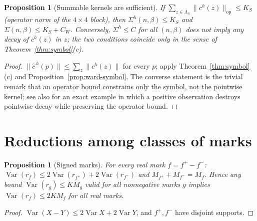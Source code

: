 \documentclass[11pt]{article}
\newtheorem{proposition}[theorem]{Proposition}
\theoremstyle{definition}
\newcommand{\Var}{\operatorname{Var}}
\begin{document}
\begin{proposition}[Summable kernels are sufficient]\label{prop:schur}
If $\sum_{z\in\Lambda_n}\|c^h(z)\|_{\mathrm{op}}\le K_S$ (operator norm of the $4\times4$ block), then
$\Sigma^h(n,\beta)\le K_S$ and $\Sigma(n,\beta)\le K_S+C_W$. Conversely, $\Sigma^h\le C$ for all $(n,\beta)$ does not
imply any decay of $c^h(z)$ in $z$; the two conditions coincide only in the sense of
Theorem~\ref{thm:symbol}(c).
\end{proposition}
\begin{proof}
$\|\hat c^{\,h}(p)\|\le\sum_z\|c^h(z)\|$ for every $p$; apply Theorem~\ref{thm:symbol}(c) and Proposition~\ref{prop:ward-symbol}.
The converse statement is the trivial remark that an operator bound constrains only the symbol, not the
pointwise kernel; see also \cite[Part~III, subsection ``An actual observation can make conditional-mean covariance \dots'']{csj} for an exact example in which a positive
observation destroys pointwise decay while preserving the operator bound.
\end{proof}

\section{Reductions among classes of marks}\label{sec:marks}

\begin{proposition}[Signed marks]\label{prop:signed}
For every real mark $f=f^+-f^-$: $\Var(r_f)\le2\Var(r_{f^+})+2\Var(r_{f^-})$ and
$M_{f^+}+M_{f^-}=M_f$. Hence any bound $\Var(r_g)\le KM_g$ valid for all nonnegative marks $g$ implies
$\Var(r_f)\le 2KM_f$ for all real marks.
\end{proposition}
\begin{proof}
$\Var(X-Y)\le2\Var X+2\Var Y$, and $f^+,f^-$ have disjoint supports.
\end{proof}
\end{document}
